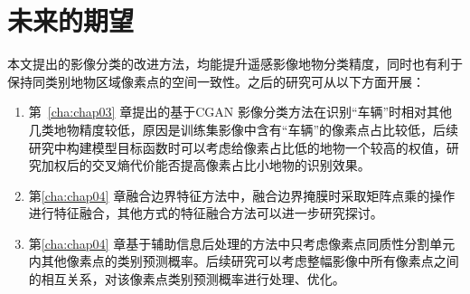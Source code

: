 \section{未来的期望}
\label{sec:5-2}
本文提出的影像分类的改进方法，均能提升遥感影像地物分类精度，同时也有利于保持同类别地物区域像素点的空间一致性。之后的研究可从以下方面开展：
\begin{enumerate}[(1)]
  \item  第~\ref{cha:chap03} 章提出的基于CGAN 影像分类方法在识别“车辆”时相对其他几类地物精度较低，原因是训练集影像中含有“车辆”的像素点占比较低，后续研究中构建模型目标函数时可以考虑给像素占比低的地物一个较高的权值，研究加权后的交叉熵代价能否提高像素占比小地物的识别效果。
  \item  第\ref{cha:chap04} 章融合边界特征方法中，融合边界掩膜时采取矩阵点乘的操作进行特征融合，其他方式的特征融合方法可以进一步研究探讨。
  \item  第\ref{cha:chap04} 章基于辅助信息后处理的方法中只考虑像素点同质性分割单元内其他像素点的类别预测概率。后续研究可以考虑整幅影像中所有像素点之间的相互关系，对该像素点类别预测概率进行处理、优化。
  
\end{enumerate}